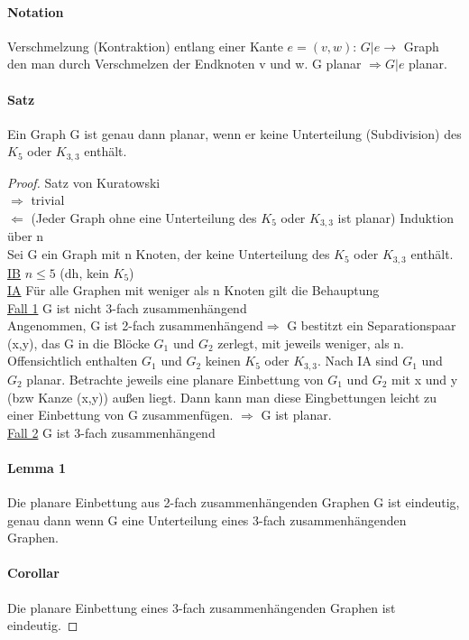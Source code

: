 \paragraph{Notation} Verschmelzung (Kontraktion) entlang einer Kante $ e=(v,w) $: $ G|e \rightarrow$ Graph den man durch Verschmelzen der Endknoten v und w. G planar $\Rightarrow G|e $ planar.
\paragraph{Satz} Ein Graph G ist genau dann planar, wenn er keine Unterteilung (Subdivision) des $ K_5 $ oder $ K_{3,3} $ enthält.

\begin{proof} Satz von Kuratowski \\
$ \Rightarrow $ trivial \\
$ \Leftarrow $ (Jeder Graph ohne eine Unterteilung des $ K_5 $ oder $ K_{3,3} $ ist planar) Induktion über n\\
Sei G ein Graph mit n Knoten, der keine Unterteilung des $ K_5 $ oder $ K_{3,3} $ enthält. \\
\underline{IB} $ n \leq 5 $ (dh, kein $ K_5 $)\\
\underline{IA} Für alle Graphen mit weniger als n Knoten gilt die Behauptung \\
\underline{Fall 1} G ist nicht 3-fach zusammenhängend \\
Angenommen, G ist 2-fach zusammenhängend$ \Rightarrow $ G bestitzt ein Separationspaar (x,y), das G in die Blöcke $ G_1 $ und $ G_2 $ zerlegt, mit jeweils weniger, als n. Offensichtlich enthalten $ G_1 $ und $ G_2 $ keinen $ K_5 $ oder $ K_{3,3} $. Nach IA sind $ G_1 $ und $ G_2 $ planar. Betrachte jeweils eine planare Einbettung von $ G_1 $ und $ G_2 $ mit x und y (bzw Kanze (x,y)) außen liegt. Dann kann man diese Eingbettungen leicht zu einer Einbettung von G zusammenfügen. $ \Rightarrow $ G ist planar. \\
\underline{Fall 2} G ist 3-fach zusammenhängend \\

\paragraph{Lemma 1} Die planare Einbettung aus 2-fach zusammenhängenden Graphen G ist eindeutig, genau dann wenn G eine Unterteilung eines 3-fach zusammenhängenden 
Graphen.

\paragraph{Corollar} Die planare Einbettung eines 3-fach zusammenhängenden Graphen ist eindeutig.


\end{proof}

